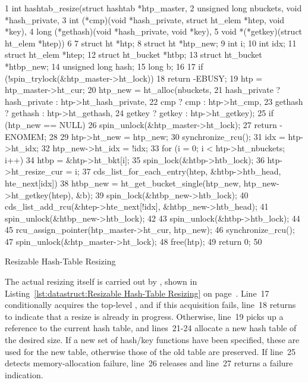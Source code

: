 \begin{listing*}[tb]
{ \scriptsize
\begin{verbbox}
 1 int hashtab_resize(struct hashtab *htp_master,
 2                    unsigned long nbuckets, void *hash_private,
 3                    int (*cmp)(void *hash_private, struct ht_elem *htep, void *key),
 4                    long (*gethash)(void *hash_private, void *key),
 5                    void *(*getkey)(struct ht_elem *htep))
 6 {
 7   struct ht *htp;
 8   struct ht *htp_new;
 9   int i;
10   int idx;
11   struct ht_elem *htep;
12   struct ht_bucket *htbp;
13   struct ht_bucket *htbp_new;
14   unsigned long hash;
15   long b;
16 
17   if (!spin_trylock(&htp_master->ht_lock))
18     return -EBUSY;
19   htp = htp_master->ht_cur;
20   htp_new = ht_alloc(nbuckets,
21                      hash_private ? hash_private : htp->ht_hash_private,
22                      cmp ? cmp : htp->ht_cmp,
23                      gethash ? gethash : htp->ht_gethash,
24                      getkey ? getkey : htp->ht_getkey);
25   if (htp_new == NULL) {
26     spin_unlock(&htp_master->ht_lock);
27     return -ENOMEM;
28   }
29   htp->ht_new = htp_new;
30   synchronize_rcu();
31   idx = htp->ht_idx;
32   htp_new->ht_idx = !idx;
33   for (i = 0; i < htp->ht_nbuckets; i++) {
34     htbp = &htp->ht_bkt[i];
35     spin_lock(&htbp->htb_lock);
36     htp->ht_resize_cur = i;
37     cds_list_for_each_entry(htep, &htbp->htb_head, hte_next[idx]) {
38       htbp_new = ht_get_bucket_single(htp_new, htp_new->ht_getkey(htep), &b);
39       spin_lock(&htbp_new->htb_lock);
40       cds_list_add_rcu(&htep->hte_next[!idx], &htbp_new->htb_head);
41       spin_unlock(&htbp_new->htb_lock);
42     }
43     spin_unlock(&htbp->htb_lock);
44   }
45   rcu_assign_pointer(htp_master->ht_cur, htp_new);
46   synchronize_rcu();
47   spin_unlock(&htp_master->ht_lock);
48   free(htp);
49   return 0;
50 }
\end{verbbox}
}
\centering
\theverbbox
\caption{Resizable Hash-Table Resizing}
\label{lst:datastruct:Resizable Hash-Table Resizing}
\end{listing*}

The actual resizing itself is carried out by , shown in
Listing~\ref{lst:datastruct:Resizable Hash-Table Resizing} on
page~\pageref{lst:datastruct:Resizable Hash-Table Resizing}.
Line~17 conditionally acquires the top-level , and if
this acquisition fails, line~18 returns  to indicate that
a resize is already in progress.
Otherwise, line~19 picks up a reference to the current hash table,
and lines~21-24 allocate a new hash table of the desired size.
If a new set of hash/key functions have been specified, these are
used for the new table, otherwise those of the old table are preserved.
If line~25 detects memory-allocation failure, line~26 releases 
and line~27 returns a failure indication.

